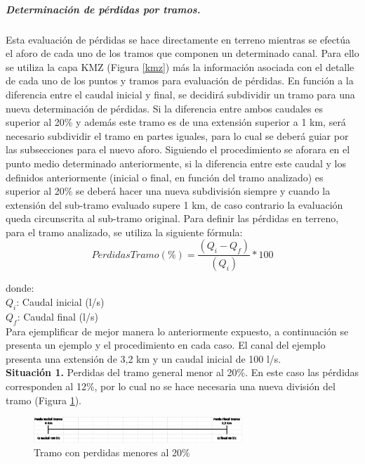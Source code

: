 \documentclass[]{article}
\begin{document}
\subparagraph{Determinación de pérdidas por tramos.}
Esta evaluación de pérdidas se hace directamente en terreno mientras se efectúa el aforo de cada uno de los tramos que componen un determinado canal. Para ello se utiliza la capa KMZ (Figura \ref{kmz}) más la información asociada con el detalle de cada uno de los puntos y tramos para evaluación de pérdidas. En función a la diferencia entre el caudal inicial y final, se decidirá subdividir un tramo para una nueva determinación de pérdidas.  Si la diferencia entre ambos caudales es superior al 20\% y además este tramo es de una extensión superior a 1 km, será necesario subdividir el tramo en partes iguales, para lo cual se deberá guiar por las subsecciones para el nuevo aforo. Siguiendo el procedimiento se aforara en el punto medio determinado anteriormente, si la diferencia entre este caudal y los definidos  anteriormente (inicial o final, en función del tramo analizado) es superior al 20\% se deberá hacer una nueva subdivisión siempre y cuando la extensión del sub-tramo evaluado supere 1 km, de caso contrario la evaluación queda circunscrita al sub-tramo original. Para definir las pérdidas en terreno, para el tramo analizado, se utiliza la siguiente fórmula:
\begin{equation}
Perdidas Tramo (\%)=\frac{(Q_i - Q_f)}{(Q_i)}*100
\end{equation}

donde:\\
$Q_i$: Caudal inicial (l/s)\\
$Q_f$: Caudal final (l/s)\\

Para ejemplificar de mejor manera lo anteriormente expuesto, a continuación se presenta un ejemplo y el procedimiento en cada caso. El canal del ejemplo presenta una extensión de 3,2 km y un caudal inicial de 100 l/s.\\

\textbf{Situación 1.} Perdidas del tramo general menor al 20\%. En este caso las pérdidas corresponden al 12\%, por lo cual no se hace necesaria una nueva división del tramo (Figura \ref{sit_1}).

\begin{figure}[h]
\centering
\includegraphics[width=0.7\textwidth]{images/sit_1.eps}
\caption{Tramo con perdidas menores al 20\%}
\label{sit_1}
\end{figure}
\end{document}

